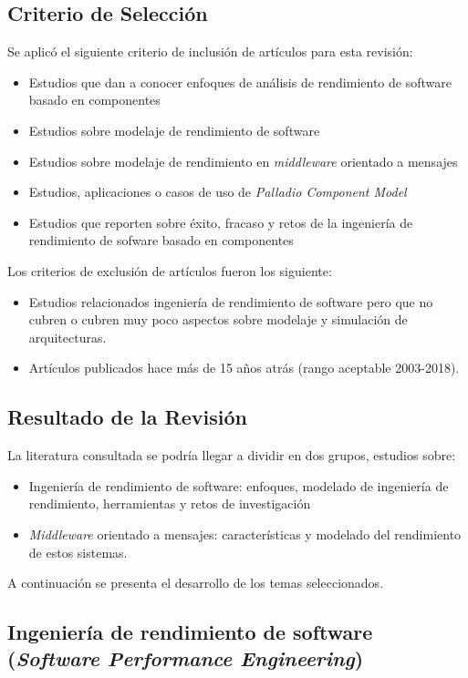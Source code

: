 \documentclass[11pt, twoside]{report}
\begin{document}
\subsection{Criterio de Selección}
Se aplicó el siguiente criterio de inclusión de artículos para esta revisión:
\begin{itemize}
    \item Estudios que dan a conocer enfoques de análisis de rendimiento de software basado en componentes
    \item Estudios sobre modelaje de rendimiento de software
    \item Estudios sobre modelaje de rendimiento en \emph{middleware} orientado a mensajes
    \item Estudios, aplicaciones o casos de uso de \emph{Palladio Component Model}
    \item Estudios que reporten sobre éxito, fracaso y retos de la ingeniería de rendimiento de sofware basado en componentes
\end{itemize}

Los criterios de exclusión de artículos fueron los siguiente:
\begin{itemize}
    \item Estudios relacionados ingeniería de rendimiento de software pero que no cubren o cubren muy poco aspectos sobre modelaje y simulación de arquitecturas.
    \item Artículos publicados hace más de 15 años atrás (rango aceptable 2003-2018).
\end{itemize}

\subsection{Resultado de la Revisión}
La literatura consultada se podría llegar a dividir en dos grupos, estudios sobre:
\begin{itemize} 
    \item Ingeniería de rendimiento de software: enfoques, modelado de ingeniería de rendimiento, herramientas y retos de investigación
    \item \emph{Middleware} orientado a mensajes: características y modelado del rendimiento de estos sistemas.
\end{itemize}

A continuación se presenta el desarrollo de los temas seleccionados.

\subsection{Ingeniería de rendimiento de software (\emph{Software Performance Engineering})}
\end{document}

